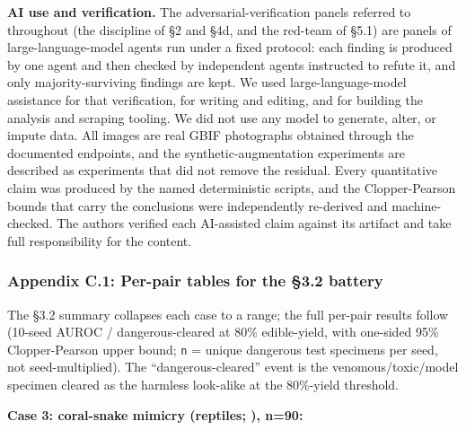 \textbf{AI use and verification.} The adversarial-verification panels
referred to throughout (the discipline of §2 and §4d, and the red-team
of §5.1) are panels of large-language-model agents run under a fixed
protocol: each finding is produced by one agent and then checked by
independent agents instructed to refute it, and only majority-surviving
findings are kept. We used large-language-model assistance for that
verification, for writing and editing, and for building the analysis and
scraping tooling. We did not use any model to generate, alter, or impute
data. All images are real GBIF photographs obtained through the
documented endpoints, and the synthetic-augmentation experiments are
described as experiments that did not remove the residual. Every
quantitative claim was produced by the named deterministic scripts, and
the Clopper-Pearson bounds that carry the conclusions were independently
re-derived and machine-checked. The authors verified each AI-assisted
claim against its artifact and take full responsibility for the content.

\subsubsection{Appendix C.1: Per-pair tables for the §3.2
battery}\label{appendix-c.1-per-pair-tables-for-the-3.2-battery}

The §3.2 summary collapses each case to a range; the full per-pair
results follow (10-seed AUROC / dangerous-cleared at 80\% edible-yield,
with one-sided 95\% Clopper-Pearson upper bound; \texttt{n} = unique
dangerous test specimens per seed, not seed-multiplied). The
``dangerous-cleared'' event is the venomous/toxic/model specimen cleared
as the harmless look-alike at the 80\%-yield threshold.

\textbf{Case 3: coral-snake mimicry (reptiles; \citep{pfennig2001}),
n=90:}

